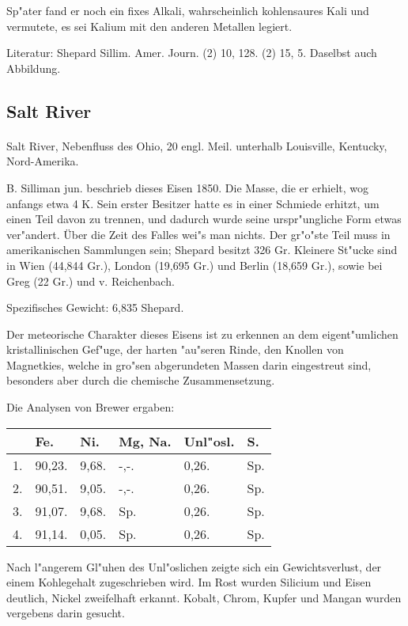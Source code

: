 \documentclass[a4paper, 11pt, oneside]{article}
\begin{document}
Sp"ater fand er noch ein fixes Alkali, wahrscheinlich kohlensaures Kali und vermutete, es sei Kalium mit den anderen Metallen legiert.

\footnotesize
Literatur: Shepard Sillim. Amer. Journ. (2) 10, 128. (2) 15, 5. Daselbst auch Abbildung.

\subsection{Salt River}
\normalsize
\paragraph{}
Salt River, Nebenfluss des Ohio, 20 engl. Meil. unterhalb Louisville, Kentucky, Nord-Amerika.

B. Silliman jun. beschrieb dieses Eisen 1850. Die Masse, die er erhielt, wog anfangs etwa 4 K. Sein erster Besitzer hatte es in einer Schmiede erhitzt, um einen Teil davon zu trennen, und dadurch wurde seine urspr"ungliche Form etwas ver"andert. Über die Zeit des Falles wei"s man nichts. Der gr"o"ste Teil muss in amerikanischen Sammlungen sein; Shepard besitzt 326 Gr. Kleinere St"ucke sind in Wien (44,844 Gr.), London (19,695 Gr.) und Berlin (18,659 Gr.), sowie bei Greg (22 Gr.) und v. Reichenbach.

Spezifisches Gewicht: 6,835 Shepard.

Der meteorische Charakter dieses Eisens ist zu erkennen an dem eigent"umlichen kristallinischen Gef"uge, der harten "au"seren Rinde, den Knollen von Magnetkies, welche in gro"sen abgerundeten Massen darin eingestreut sind, besonders aber durch die chemische Zusammensetzung.

Die Analysen von Brewer ergaben:
\begin{table}[H]
    \centering
    \begin{tabular}{l l l l l l}
         & Fe. & Ni. & Mg, Na. & Unl"osl. & S. \\ \hline
        1. & 90,23. & 9,68. & -,-. & 0,26. & Sp. \\
        2. & 90,51. & 9,05. & -,-. & 0,26. & Sp. \\
        3. & 91,07. & 9,68. & Sp. & 0,26. & Sp. \\
        4. & 91,14. & 0,05. & Sp. & 0,26. & Sp. \\
    \end{tabular}
\end{table}

Nach l"angerem Gl"uhen des Unl"oslichen zeigte sich ein Gewichtsverlust, der einem Kohlegehalt zugeschrieben wird. Im Rost wurden Silicium und Eisen deutlich, Nickel zweifelhaft erkannt. Kobalt, Chrom, Kupfer und Mangan wurden vergebens darin gesucht.
\end{document}
